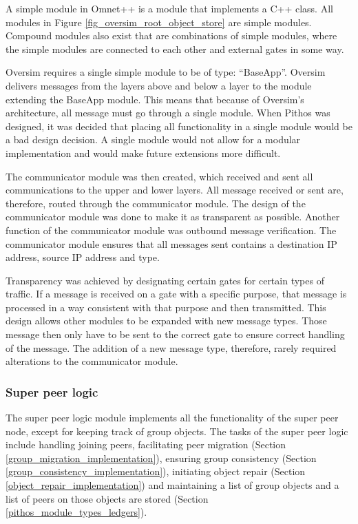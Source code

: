 A simple module in Omnet++ is a module that implements a C++ class. All modules in Figure \ref{fig_oversim_root_object_store} are simple modules. Compound modules also exist that are combinations of simple modules, where the simple modules are connected to each other and external gates in some way.

Oversim requires a single simple module to be of type: ``BaseApp''. Oversim delivers messages from the layers above and below a layer to the module extending the BaseApp module. This means that because of Oversim's architecture, all message must go through a single module. When Pithos was designed, it was decided that placing all functionality in a single module would be a bad design decision. A single module would not allow for a modular implementation and would make future extensions more difficult.

The communicator module was then created, which received and sent all communications to the upper and lower layers. All message received or sent are, therefore, routed through the communicator module. The design of the communicator module was done to make it as transparent as possible. Another function of the communicator module was outbound message verification. The communicator module ensures that all messages sent contains a destination IP address, source IP address and type.

Transparency was achieved by designating certain gates for certain types of traffic. If a message is received on a gate with a specific purpose, that message is processed in a way consistent with that purpose and then transmitted. This design allows other modules to be expanded with new message types. Those message then only have to be sent to the correct gate to ensure correct handling of the message. The addition of a new message type, therefore, rarely required alterations to the communicator module.

\subsubsection{Super peer logic}
\label{pithos_module_types_sp_logic}

The super peer logic module implements all the functionality of the super peer node, except for keeping track of group objects. The tasks of the super peer logic include handling joining peers, facilitating peer migration (Section \ref{group_migration_implementation}), ensuring group consistency (Section \ref{group_consistency_implementation}), initiating object repair (Section \ref{object_repair_implementation}) and maintaining a list of group objects and a list of peers on those objects are stored (Section \ref{pithos_module_types_ledgers}).

